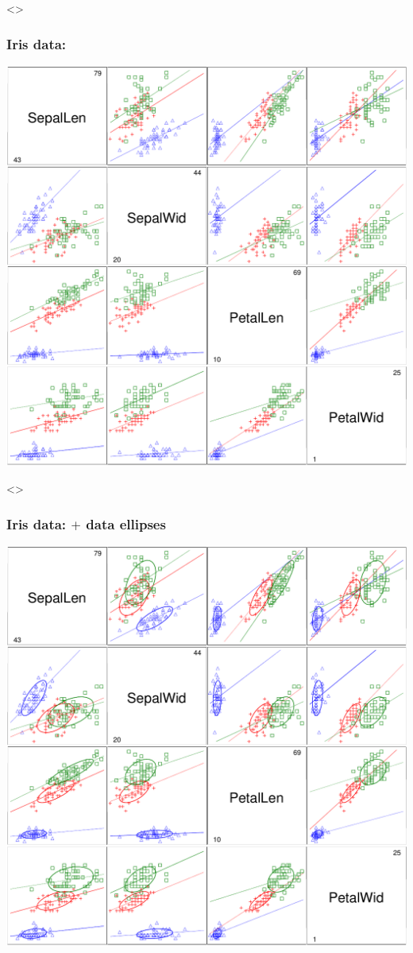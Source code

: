 \begin{frame}<\inlong>
  \frametitle{Iris data: \scatmat}
  \begin{center}
  \includegraphics[height=.8\textheight,clip]{fig/scatirise}
  \end{center}

\end{frame}

\begin{frame}<\inlong>
  \frametitle{Iris data: \scatmat $+$ data ellipses}
  \begin{center}
  \includegraphics[height=.8\textheight,clip]{fig/scatirisd1}
  \end{center}
\end{frame}

